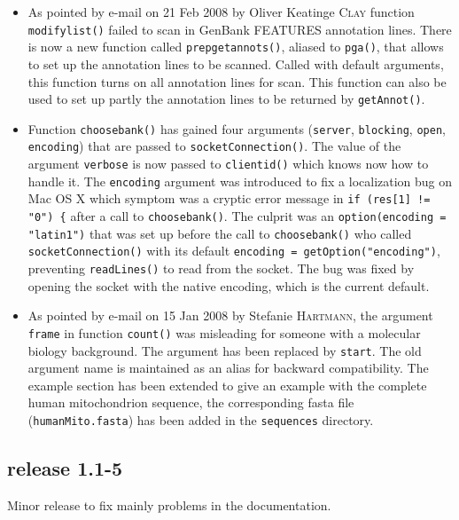 \documentclass{article}
\begin{document}
\begin{itemize}
\item As pointed by e-mail on 21 Feb 2008 by Oliver Keatinge \textsc{Clay}
  function \texttt{modifylist()} failed to scan in GenBank FEATURES
  annotation lines. There is now a new function called
  \texttt{prepgetannots()}, aliased to \texttt{pga()}, that allows
  to set up the annotation lines to be scanned. Called with default
  arguments, this function turns on all annotation lines for scan.
  This function can also be used to set up partly the annotation lines
  to be returned by \texttt{getAnnot()}.

\item Function \texttt{choosebank()} has gained four arguments
  (\texttt{server}, \texttt{blocking}, \texttt{open}, \texttt{encoding})
  that are passed to \texttt{socketConnection()}. The value of
  the argument \texttt{verbose} is now passed to \texttt{clientid()}
  which knows now how to handle it. The \texttt{encoding} argument
  was introduced to fix a localization bug on Mac OS X which symptom was a
  cryptic error message in \texttt{if (res[1] != "0") \{} after
  a call to \texttt{choosebank()}. The culprit was an
  \texttt{option(encoding = "latin1")} that was set up before
  the call to \texttt{choosebank()} who called \texttt{socketConnection()}
  with its default \texttt{encoding = getOption("encoding")},
  preventing \texttt{readLines()} to read from the socket.
  The bug was fixed by opening the socket with the native encoding,
  which is the current default.

\item As pointed by e-mail on 15 Jan 2008 by Stefanie \textsc{Hartmann}, the
  argument \texttt{frame} in function \texttt{count()} was misleading
  for someone with a molecular biology background. The argument has
  been replaced by \texttt{start}. The old argument name is maintained
  as an alias for backward compatibility. The example section has 
  been extended to
  give an example with the complete human mitochondrion sequence, the
  corresponding fasta file (\texttt{humanMito.fasta}) has been added in the 
  \texttt{sequences} directory.
\end{itemize}

\subsection*{release 1.1-5}

Minor release to fix mainly problems in the documentation.
\end{document}
